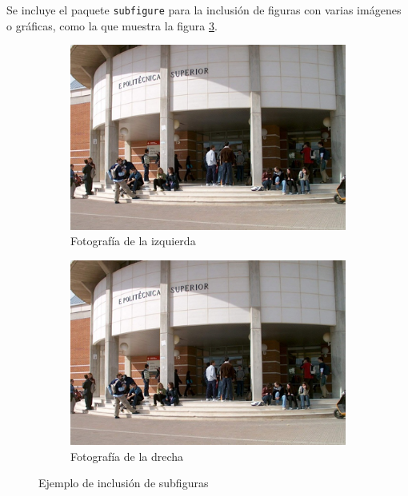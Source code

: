 Se incluye el paquete \verb+subfigure+ para la inclusión de figuras con varias imágenes o gráficas, como la que muestra la figura \ref{fig:subfiguras}.
\begin{figure}[htb]
\begin{center}
\begin{subfigure}[b]{0.4\linewidth}
\begin{center}
\includegraphics[width=0.9\linewidth]{figs/esiiab.png}
\caption{Fotografía de la izquierda}\label{fig:esiiabIII}
\end{center}
\end{subfigure} 
\begin{subfigure}[b]{0.4\linewidth}
\begin{center}
\includegraphics[width=0.9\linewidth]{figs/esiiab.png}
\caption{Fotografía de la drecha}\label{fig:esiiabIV}
\end{center}
\end{subfigure} 
\end{center}
\caption[Ejemplo de subfiguras]{Ejemplo de inclusión de subfiguras}
\label{fig:subfiguras}
\end{figure}




